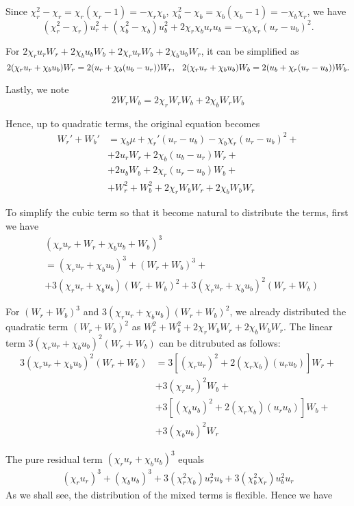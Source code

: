 \documentclass[letterpaper,11pt]{article}
\numberwithin{equation}{section}
\theoremstyle{plain}
\begin{document}
\begin{itemize}
Since $\chi_r^2 - \chi_r = \chi_r(\chi_r - 1)=-\chi_r\chi_b$, $\chi_b^2-\chi_b = \chi_b(\chi_b-1) = -\chi_b\chi_r$, we have
\[
(\chi_r^2-\chi_r)u_r^2 + (\chi_b^2-\chi_b)u_b^2 + 2\chi_r\chi_bu_ru_b = -\chi_b\chi_r(u_r-u_b)^2.
\]

For $2\chi_r u_rW_r+2\chi_b u_bW_b+2\chi_ru_rW_b + 2\chi_bu_bW_r$, it can be simplified as
\[
2(\chi_ru_r+\chi_bu_b)W_r = 2(u_r + \chi_b(u_b-u_r))W_r, \hspace{0.1in}2(\chi_ru_r+\chi_bu_b)W_b = 2(u_b + \chi_r(u_r-u_b))W_b.
\]

Lastly, we note
\[
2W_rW_b = 2\chi_rW_rW_b + 2\chi_bW_rW_b
\]

Hence, up to quadratic terms, the original equation becomes
\begin{align*}
W_r' + W_b' &= \chi_b\mu + \chi_r'(u_r-u_b) - \chi_b\chi_r(u_r-u_b)^2 +\\
& + 2u_rW_r + 2\chi_b(u_b-u_r)W_r +\\
& + 2u_bW_b + 2\chi_r(u_r-u_b)W_b +\\
& + W_r^2 + W_b^2 + 2\chi_rW_bW_r + 2\chi_bW_bW_r
\end{align*}

To simplify the cubic term so that it become natural to distribute the terms, first we have
\begin{align*}
&(\chi_ru_r+W_r+\chi_bu_b+W_b)^3\\ &=(\chi_ru_r+\chi_bu_b)^3 + (W_r+W_b)^3+ \\&+ 3(\chi_ru_r+\chi_bu_b)(W_r+W_b)^2+3(\chi_ru_r+\chi_bu_b)^2(W_r+W_b)
\end{align*}

For $(W_r+W_b)^3$ and $3(\chi_ru_r+\chi_bu_b)(W_r+W_b)^2$, we already distributed the quadratic term $(W_r+W_b)^2$ as $W_r^2+W_b^2+2\chi_rW_bW_r+2\chi_bW_bW_r$. The linear term $3(\chi_ru_r+\chi_bu_b)^2(W_r+W_b)$ can be ditrubuted as follows:
\begin{align*}
3(\chi_ru_r+\chi_bu_b)^2(W_r+W_b) &= 3[(\chi_ru_r)^2+2(\chi_r\chi_b)(u_ru_b)] W_r +\\&+ 3(\chi_ru_r)^2W_b + \\
&+3[(\chi_bu_b)^2+2(\chi_r\chi_b)(u_ru_b)] W_b  +\\
&+ 3(\chi_bu_b)^2W_r 
\end{align*}

The pure residual term $(\chi_ru_r + \chi_bu_b)^3$ equals
\begin{align*}
(\chi_r u_r)^3+(\chi_b u_b)^3 + 3(\chi_r^2\chi_b)u_r^2u_b +  3(\chi_b^2\chi_r)u_b^2u_r
\end{align*}
As we shall see, the distribution of the mixed terms is flexible. Hence we have

\end{itemize}
\end{document}
